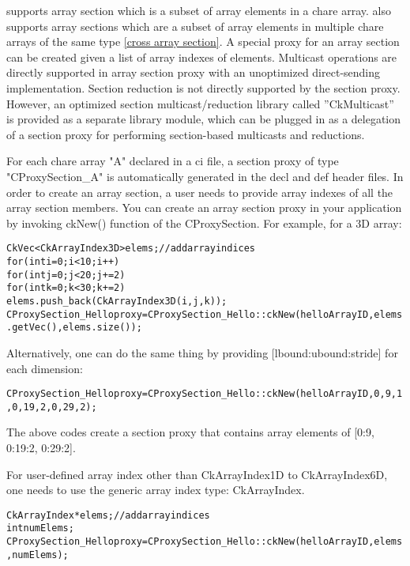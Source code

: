 \label{array section}

\charmpp{} supports array section which is a subset of array 
elements in a chare array. \charmpp{} also supports array sections
which are a subset of array elements in multiple chare arrays of the
same type \ref{cross array section}.
A special proxy for an array section can be created given a list of array
indexes of elements.
Multicast operations are directly supported in array section proxy with
an unoptimized direct-sending implementation.
Section reduction is not directly supported by the section proxy. 
However, an optimized section multicast/reduction 
library called ''CkMulticast'' is provided as a separate library module,
which can be plugged in as a delegation of a section proxy for performing
section-based multicasts and reductions. 

For each chare array "A" declared in a ci file, a section proxy 
of type "CProxySection\_A" is automatically generated in the decl and def 
header files. 
In order to create an array section, a user needs to provide array indexes 
of all the array section members.
You can create an array section proxy in your application by 
invoking ckNew() function of the CProxySection.
For example, for a 3D array:

\begin{alltt}
  CkVec<CkArrayIndex3D> elems;    // add array indices
  for (int i=0; i<10; i++)
    for (int j=0; j<20; j+=2)
      for (int k=0; k<30; k+=2)
         elems.push_back(CkArrayIndex3D(i, j, k));
  CProxySection_Hello proxy = CProxySection_Hello::ckNew(helloArrayID, elems.getVec(), elems.size());
\end{alltt}

Alternatively, one can do the same thing by providing [lbound:ubound:stride] 
for each dimension:

\begin{alltt}
  CProxySection_Hello proxy = CProxySection_Hello::ckNew(helloArrayID, 0, 9, 1, 0, 19, 2, 0, 29, 2);
\end{alltt}

The above codes create a section proxy that contains array elements of 
[0:9, 0:19:2, 0:29:2].

For user-defined array index other than CkArrayIndex1D to CkArrayIndex6D,
one needs to use the generic array index type: CkArrayIndex.

\begin{alltt}
  CkArrayIndex *elems;    // add array indices
  int numElems;
  CProxySection_Hello proxy = CProxySection_Hello::ckNew(helloArrayID, elems, numElems);
\end{alltt}

